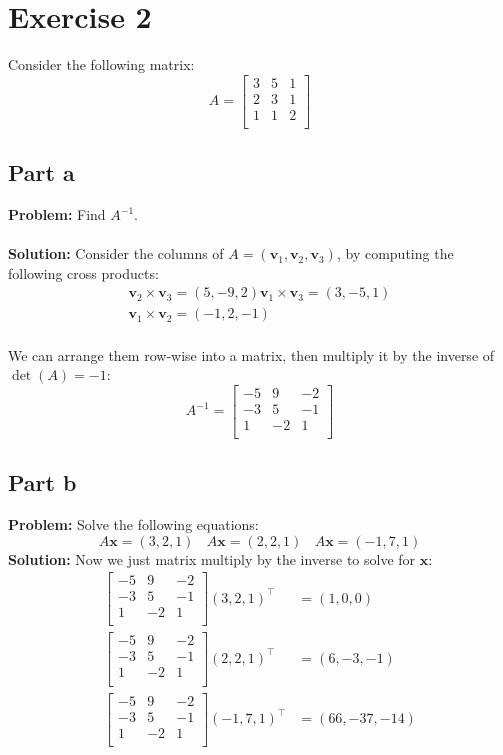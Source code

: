 \documentclass{article}
\begin{document}
\section*{Exercise 2}
Consider the following matrix:
$$A=\begin{bmatrix}
    3 & 5 & 1 \\
    2 & 3 & 1 \\
    1 & 1 & 2 \\
\end{bmatrix}$$
\subsection*{Part a}
\textbf{Problem:} Find $A^{-1}$.
\\\\
\textbf{Solution:} Consider the columns of $A=(\mathbf v_1,\mathbf v_2,\mathbf v_3)$, by computing the following cross products:
\begin{align*}
  \mathbf v_2\times\mathbf v_3=(5,-9,2)
  \mathbf v_1\times\mathbf v_3=(3,-5,1)\\
  \mathbf v_1\times\mathbf v_2=(-1,2,-1)\\
\end{align*}

We can arrange them row-wise into a matrix, then multiply it by the inverse of $\operatorname{det}(A)=-1$:
$$A^{-1}=\begin{bmatrix}
    -5 & 9 & -2 \\
    -3 & 5 & -1 \\
    1 & -2 & 1 \\
\end{bmatrix}$$

\subsection*{Part b}
\textbf{Problem:} Solve the following equations:
$$A\mathbf x=(3,2,1)\ \ \ \  A\mathbf x=(2,2,1)\ \ \ \  A\mathbf x=(-1,7,1)$$
\textbf{Solution:} Now we just matrix multiply by the inverse to solve for $\mathbf x$:
\begin{align*}
  \begin{bmatrix}
      -5 & 9 & -2 \\
      -3 & 5 & -1 \\
      1 & -2 & 1 \\
  \end{bmatrix}(3,2,1)^\top&=(1,0,0)\\
  \begin{bmatrix}
      -5 & 9 & -2 \\
      -3 & 5 & -1 \\
      1 & -2 & 1 \\
  \end{bmatrix}(2,2,1)^\top&=(6,-3,-1)\\
  \begin{bmatrix}
      -5 & 9 & -2 \\
      -3 & 5 & -1 \\
      1 & -2 & 1 \\
  \end{bmatrix}(-1,7,1)^\top&=(66,-37,-14)\\
\end{align*}
\end{document}
